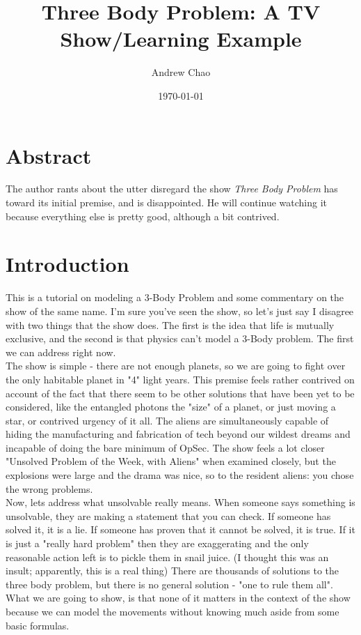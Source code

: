 \documentclass[11pt]{article} %
\title{Three Body Problem: A TV Show/Learning Example}
\author{Andrew Chao}
\date{\today}
\begin{document}
\maketitle

\section{Abstract}
The author rants about the utter disregard the show \emph{Three Body Problem} has toward its initial premise, and is disappointed. He will continue watching it because everything else is pretty good, although a bit contrived. 

\section{Introduction}

This is a tutorial on modeling a 3-Body Problem and some commentary on the show of the same name. I'm sure you've seen the show, so let's just say I disagree with two things that the show does. The first is the idea that life is mutually exclusive, and the second is that physics can't model a 3-Body problem. The first we can address right now.\\

The show is simple - there are not enough planets, so we are going to fight over the only habitable planet in "4" light years. This premise feels rather contrived on account of the fact that there seem to be other solutions that have been yet to be considered, like the entangled photons the "size" of a planet, or just moving a star, or contrived urgency of it all. The aliens are simultaneously capable of hiding the manufacturing and fabrication of tech beyond our wildest dreams and incapable of doing the bare minimum of OpSec. The show feels a lot closer "Unsolved Problem of the Week, with Aliens" when examined closely, but the explosions were large and the drama was nice, so to the resident aliens: you chose the wrong problems.\\

Now, lets address what unsolvable really means. When someone says something is unsolvable, they are making a statement that you can check. If someone has solved it, it is a lie. If someone has proven that it cannot be solved, it is true. If it is just a "really hard problem" then they are exaggerating and the only reasonable action left is to pickle them in snail juice. (I thought this was an insult; apparently, this is a real thing) There are thousands of solutions to the three body problem, but there is no general solution - "one to rule them all". What we are going to show, is that none of it matters in the context of the show because we can model the movements without knowing much aside from some basic formulas.\\
\end{document}
